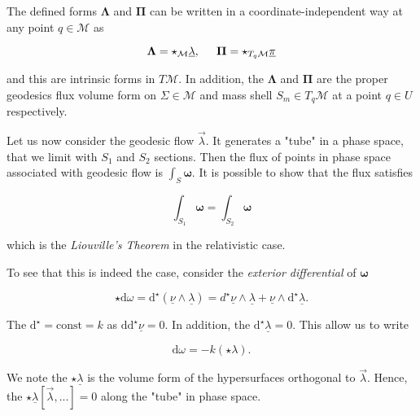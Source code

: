 The defined forms $\boldsymbol{\Lambda}$ and $\boldsymbol{\Pi}$ can be written in a coordinate-independent way at any point $q\in\mathcal{M}$ as 

\begin{equation}
\boldsymbol{\Lambda} = \star_{\mathcal{M}}\underline{\lambda}, \hspace{5mm} \boldsymbol{\Pi} = \star_{T_q\mathcal{M}}\underline{\pi}
\end{equation}

and this are intrinsic forms in $T\mathcal{M}$. 
In addition, the $\boldsymbol{\Lambda}$ and $\boldsymbol{\Pi}$ are the proper geodesics flux
volume form on $\Sigma\in\mathcal{M}$ and mass shell $S_m\in T_q\mathcal{M}$ at a point $q\in U$ respectively.

Let us now consider the geodesic flow $\vec{\lambda}$. 
It generates a "tube" in a phase space, that we limit with $S_1$ and $S_2$ sections. 
Then the flux of points in phase space associated with geodesic flow is $\int_{S}\boldsymbol{\omega}$. 
It is possible to show that the flux satisfies

\begin{equation}
\int_{S_1}\boldsymbol{\omega} = \int_{S_2}\boldsymbol{\omega}
\label{eq:theory:liuville}
\end{equation}

which is the \textit{Liouville’s Theorem} in the relativistic case.

To see that this is indeed the case, consider the \textit{exterior differential} of $\boldsymbol{\omega}$

\begin{equation}
\star\text{d}\omega = \text{d}^{\star}(\underline{\nu}\wedge\underline{\lambda}) = d^{\star}\underline{\nu}\wedge\underline{\lambda} + \underline{\nu}\wedge\text{d}^{\star}\underline{\lambda}.
\end{equation}

The $\text{d}^{\star}=\text{const}=k$ as $\text{dd}^{\star}\underline{\nu}=0$. 
In addition, the $\text{d}^{\star}\underline{\lambda}=0$. 
This allow us to write 

\begin{equation}
\text{d}\omega = -k(\star\lambda).
\end{equation}

We note the $\star\underline{\lambda}$ is the volume form of the hypersurfaces orthogonal to $\vec{\lambda}$. 
Hence, the $\star\underline{\lambda}[\vec{\lambda},...]=0$ along the "tube" in phase space. 

